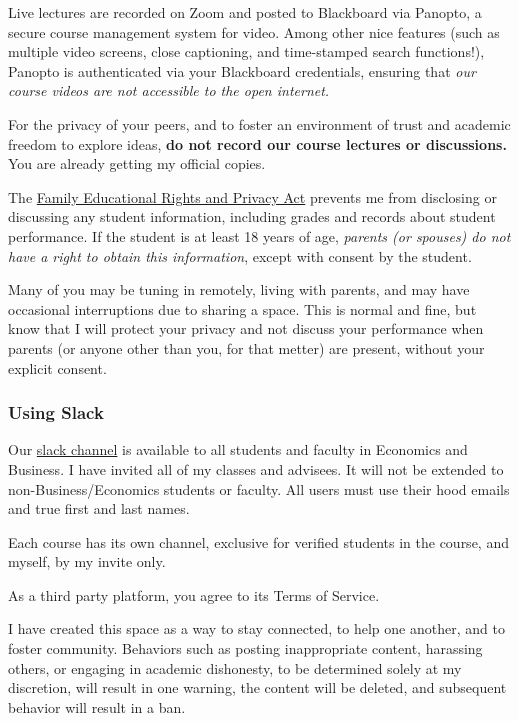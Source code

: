 \documentclass{article}
\begin{document}
Live lectures are recorded on Zoom and posted to Blackboard via Panopto,
a secure course management system for video. Among other nice features
(such as multiple video screens, close captioning, and time-stamped
search functions!), Panopto is authenticated via your Blackboard
credentials, ensuring that \emph{our course videos are not accessible to
the open internet.}

For the privacy of your peers, and to foster an environment of trust and
academic freedom to explore ideas, \textbf{do not record our course
lectures or discussions.} You are already getting my official copies.

The
\href{https://www2.ed.gov/policy/gen/guid/fpco/ferpa/index.html}{Family
Educational Rights and Privacy Act} prevents me from disclosing or
discussing any student information, including grades and records about
student performance. If the student is at least 18 years of age,
\emph{parents (or spouses) do not have a right to obtain this
information}, except with consent by the student.

Many of you may be tuning in remotely, living with parents, and may have
occasional interruptions due to sharing a space. This is normal and
fine, but know that I will protect your privacy and not discuss your
performance when parents (or anyone other than you, for that metter) are
present, without your explicit consent.

\hypertarget{using-slack}{%
\subsubsection*{Using Slack}\label{using-slack}}

Our \href{https://hoodcollegeeconomics.slack.com}{slack channel} is
available to all students and faculty in Economics and Business. I have
invited all of my classes and advisees. It will not be extended to
non-Business/Economics students or faculty. All users must use their
hood emails and true first and last names.

Each course has its own channel, exclusive for verified students in the
course, and myself, by my invite only.

As a third party platform, you agree to its Terms of Service.

I have created this space as a way to stay connected, to help one
another, and to foster community. Behaviors such as posting
inappropriate content, harassing others, or engaging in academic
dishonesty, to be determined solely at my discretion, will result in one
warning, the content will be deleted, and subsequent behavior will
result in a ban.
\end{document}
